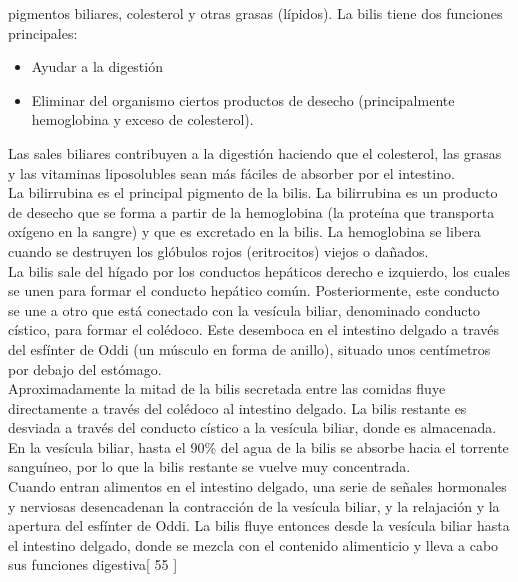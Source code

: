 pigmentos biliares, colesterol y otras grasas (lípidos). La bilis tiene dos funciones principales:\\
\begin{itemize}
    \item Ayudar a la digestión
    \item Eliminar del organismo ciertos productos de desecho (principalmente hemoglobina y exceso de colesterol).    
\end{itemize}
Las sales biliares contribuyen a la digestión haciendo que el colesterol, las grasas y las vitaminas liposolubles sean más fáciles de absorber por el intestino.\\
La bilirrubina es el principal pigmento de la bilis. La bilirrubina es un producto de desecho que se forma a partir de la hemoglobina (la proteína que transporta 
oxígeno en la sangre) y que es excretado en la bilis. La hemoglobina se libera cuando se destruyen los glóbulos rojos (eritrocitos) viejos o dañados.\\
La bilis sale del hígado por los conductos hepáticos derecho e izquierdo, los cuales se unen para formar el conducto hepático común. Posteriormente, este conducto 
se une a otro que está conectado con la vesícula biliar, denominado conducto cístico, para formar el colédoco. Este desemboca en el intestino delgado a través del 
esfínter de Oddi (un músculo en forma de anillo), situado unos centímetros por debajo del estómago.\\
Aproximadamente la mitad de la bilis secretada entre las comidas fluye directamente a través del colédoco al intestino delgado. La bilis restante es desviada a 
través del conducto cístico a la vesícula biliar, donde es almacenada. En la vesícula biliar, hasta el 90\% del agua de la bilis se absorbe hacia el torrente sanguíneo, 
por lo que la bilis restante se vuelve muy concentrada.\\
Cuando entran alimentos en el intestino delgado, una serie de señales hormonales y nerviosas desencadenan la contracción de la vesícula biliar, y la relajación y la apertura del 
esfínter de Oddi. La bilis fluye entonces desde la vesícula biliar hasta el intestino delgado, donde se mezcla con el contenido alimenticio y lleva a cabo sus funciones digestiva[ 55 ]\\
